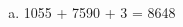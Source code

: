\documentclass[a4paper,14pt]{article}
\begin{document}
\begin{multicols}{2}
\begin{enumerate}
\begin{enumerate}[a)]
				\item 1055 + 7590 + 3 = 8648 \\\\\\\\\\\\\\\\\\\\
			\end{enumerate}
        \end{enumerate}
    $~$ \\ $~$ \\ $~$ \\ $~$ \\ $~$ \\ $~$ \\ $~$ \\ $~$ \\ $~$ \\ $~$ \\ $~$ \\ $~$ \\ $~$ \\ $~$ \\ $~$ \\ $~$ \\ $~$ \\ $~$ \\ $~$ \\ $~$ \\ $~$ \\ $~$ \\ $~$ \\ $~$ \\ $~$ \\ $~$ \\ $~$ \\ $~$ \\ $~$ \\ $~$ \\ $~$ \\ $~$ \\ $~$ \\ $~$ \\ $~$ \\ $~$ \\ $~$ \\ $~$ \\ $~$ \\ $~$ \\ $~$ \\ $~$ \\ $~$ \\ $~$ \\ $~$ \\ $~$ \\ 
    \end{multicols}
\end{document}
